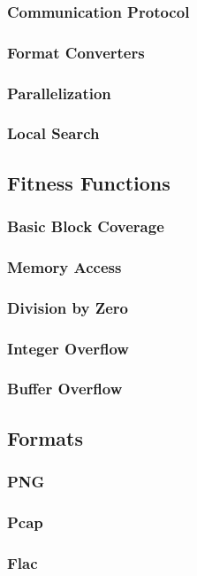 \documentclass[a4paper]{scrartcl}
\begin{document}
\subsubsection{Communication Protocol}
\subsubsection{Format Converters}
\subsubsection{Parallelization}
\subsubsection{Local Search}
\subsection{Fitness Functions}
\subsubsection{Basic Block Coverage}
\subsubsection{Memory Access}
\subsubsection{Division by Zero}
\subsubsection{Integer Overflow}
\subsubsection{Buffer Overflow}
\subsection{Formats}
\subsubsection{PNG}
\subsubsection{Pcap}
\subsubsection{Flac}
\end{document}

